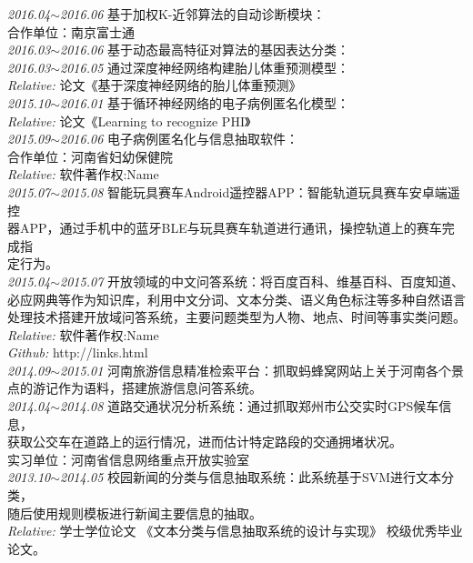 \documentclass[line, margin]{res}
\newcommand{\xiaowu}{\fontsize{9pt}{15.75pt}\selectfont} %
\begin{document}
\begin{resume}
 { 
 {\sl 2016.04$\sim$2016.06} 基于加权K-近邻算法的自动诊断模块：{  \\
 合作单位：南京富士通}\\
[5pt] 
 {\sl 2016.03$\sim$2016.06} 基于动态最高特征对算法的基因表达分类：{ }\\
[5pt] 
 {\sl 2016.03$\sim$2016.05} 通过深度神经网络构建胎儿体重预测模型：{ }\\
 {\sl Relative:} {\xiaowu 论文《基于深度神经网络的胎儿体重预测》} \\
[5pt]
 {\sl 2015.10$\sim$2016.01} 基于循环神经网络的电子病例匿名化模型：{ } \\
 {\sl Relative:} {\xiaowu 论文《Learning to recognize PHI》}\\
[5pt] 
 {\sl 2015.09$\sim$2016.06} 电子病例匿名化与信息抽取软件：{ \\
 合作单位：河南省妇幼保健院} \\
 {\sl Relative:} {\xiaowu 软件著作权:Name} \\
[5pt]
 {\sl 2015.07$\sim$2015.08} 智能玩具赛车Android遥控器APP：{ 智能轨道玩具赛车安卓端遥控\\
 器APP，通过手机中的蓝牙BLE与玩具赛车轨道进行通讯，操控轨道上的赛车完成指\\
 定行为。}\\
[5pt]
 {\sl 2015.04$\sim$2015.07} 开放领域的中文问答系统：{ 将百度百科、维基百科、百度知道、\\
 必应网典等作为知识库，利用中文分词、文本分类、语义角色标注等多种自然语言\\
 处理技术搭建开放域问答系统，主要问题类型为人物、地点、时间等事实类问题。}\\ 
 {\sl Relative:} {\xiaowu 软件著作权:Name} \\
 {\sl Github:} {\xiaowu http://links.html} \\
[5pt]
 {\sl 2014.09$\sim$2015.01} 河南旅游信息精准检索平台：{ 抓取蚂蜂窝网站上关于河南各个景\\
 点的游记作为语料，搭建旅游信息问答系统。} \\
[5pt]
 {\sl 2014.04$\sim$2014.08} 道路交通状况分析系统：{ 通过抓取郑州市公交实时GPS候车信息，\\
 获取公交车在道路上的运行情况，进而估计特定路段的交通拥堵状况。 \\
 实习单位：河南省信息网络重点开放实验室} \\
[5pt]
 {\sl 2013.10$\sim$2014.05} 校园新闻的分类与信息抽取系统：{ 此系统基于SVM进行文本分类，\\
 随后使用规则模板进行新闻主要信息的抽取。}\\
   {\sl Relative:} {\xiaowu 学士学位论文 《文本分类与信息抽取系统的设计与实现》 校级优秀毕业论文。}} \\
 

\end{resume}
\end{document}
